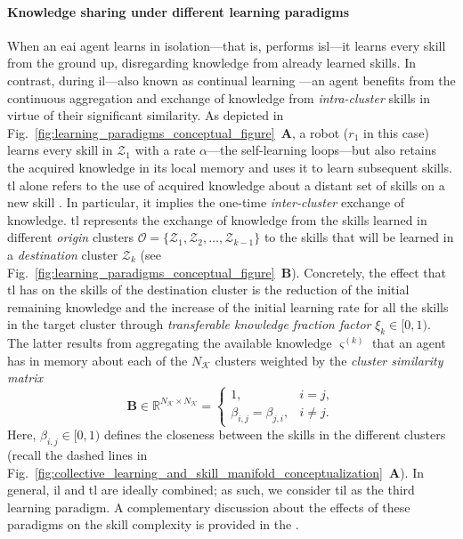 \documentclass[12pt]{article}
\renewcommand{\emph}[1]{\textit{#1}}
\begin{document}
\paragraph*{Knowledge sharing under different learning paradigms}
When an \ac{eai} agent learns in isolation---that is, performs \ac{isl}---it learns every skill from the ground up, disregarding knowledge from already learned skills. In contrast, during \ac{il}---also known as continual learning \cite{Lesort2020Continuallearningrobotics}---an agent benefits from the continuous aggregation and exchange of knowledge from \emph{intra-cluster} skills in virtue of their significant similarity. As depicted in Fig.~\ref{fig:learning_paradigms_conceptual_figure}~\textbf{A}, a robot ($r_1$ in this case) learns every skill in $\mathcal{Z}_1$ with a rate $\alpha$---the self-learning loops---but also retains the acquired knowledge in its local memory and uses it to learn subsequent skills. \Ac{tl} alone refers to the use of acquired knowledge about a distant set of skills on a new skill \cite{Hosna2022Transferlearningfriendly,Jaquier2023TransferLearningRobotics}. In particular, it implies the one-time \emph{inter-cluster} exchange of knowledge. \Ac{tl} represents the exchange of knowledge from the skills learned in different \emph{origin} clusters $\mathcal{O} = \{ \mathcal{Z}_1,\mathcal{Z}_2,\ldots,\mathcal{Z}_{k-1} \}$ to the skills that will be learned in a \emph{destination} cluster $\mathcal{Z}_k$ (see Fig.~\ref{fig:learning_paradigms_conceptual_figure}~\textbf{B}). Concretely, the effect that \ac{tl} has on the skills of the destination cluster is the reduction of the initial remaining knowledge and the increase of the initial learning rate for all the skills in the target cluster through \emph{transferable knowledge fraction factor} $\xi_k \in [0,1)$. The latter results from aggregating the available knowledge $\varsigma^{(k)}$ that an agent has in memory about each of the $N_\mathcal{K}$ clusters weighted by the \emph{cluster similarity matrix}
\begin{equation}\label{eq:cluster_similarity_matrix}
	\bm{B}\in \mathbb{R}^{N_\mathcal{K} \times N_\mathcal{K}}=\begin{cases}
		1, & i=j, \\
		\beta_{i,j} = \beta_{j,i}, & i \neq j.
	\end{cases}
\end{equation}
Here, $\beta_{i,j} \in [0,1)$ defines the closeness between the skills in the different clusters (recall the dashed lines in  Fig.~\ref{fig:collective_learning_and_skill_manifold_conceptualization}~\textbf{A}). In general, \ac{il} and \ac{tl} are ideally combined; as such, we consider \ac{til} as the third learning paradigm. A complementary discussion about the effects of these paradigms on the skill complexity is provided in the .
\end{document}
